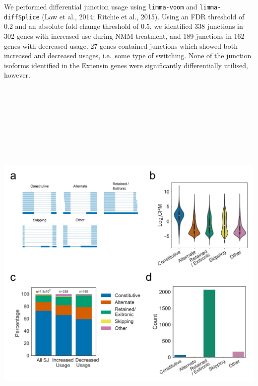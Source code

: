 \documentclass[12pt,a4paper,]{report}
\let\origfigure=\figure
\let\endorigfigure=\endfigure
\renewenvironment{figure}[1][2] {
    \expandafter\origfigure\expandafter[H]
} {
    \endorigfigure
}
\begin{document}
We performed differential junction usage using \texttt{limma-voom} and
\texttt{limma-diffSplice} (Law et al., 2014; Ritchie et al., 2015).
Using an FDR threshold of 0.2 and an absolute fold change threshold of
0.5, we identified 338 junctions in 302 genes with increased use during
NMM treatment, and 189 junctions in 162 genes with decreased usage. 27
genes contained junctions which showed both increased and decreased
usages, i.e.~some type of switching. None of the junction isoforms
identified in the Extensin genes were significantly differentially
utilised, however.

\newpage

\begin{figure}[htbp]
\centering
\includegraphics[width=\textwidth,height=562pt,keepaspectratio]{chapter_6/figures/diff_splice_results.png}

\end{figure}
\end{document}
